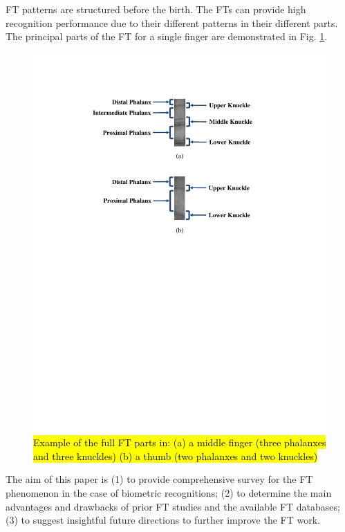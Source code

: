 \documentclass[review]{elsarticle}
\begin{document}
	FT patterns are structured before the birth. The FTs can provide high recognition performance due to their different patterns in their different parts. The principal parts of the FT for a single finger are demonstrated in Fig. \ref{fig:FT_midd_thumb}.
	\begin{figure}[!h]
		\centering
		\includegraphics[page=1,scale=1.1,trim=4cm 14cm 4cm 3cm,clip]{FT0.pdf}
		\caption{\hl{Example of the full FT parts in:
		(a) a middle finger (three phalanxes and three knuckles)
		(b) a thumb (two phalanxes and two knuckles)}}	\label{fig:FT_midd_thumb}
	\end{figure}

	The aim of this paper is (1) to provide comprehensive survey for the FT phenomenon in the case of biometric recognitions; (2) to determine the main advantages and drawbacks of prior FT studies and the available FT databases; (3) to suggest insightful future directions to further improve the FT work.  
\end{document}
